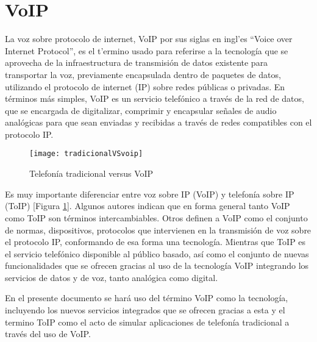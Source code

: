 	
	\section{VoIP}
	
	La voz sobre protocolo de internet, VoIP por sus siglas en 
	ingl'es “Voice over Internet Protocol”, es el t'ermino usado 
	para referirse a la tecnología que se aprovecha de la 
	infraestructura de transmisión de datos existente para 
	transportar la voz, previamente encapsulada dentro de paquetes 
	de datos, utilizando el protocolo de internet (IP) sobre 
	redes públicas o privadas. En términos más simples, VoIP 
	es un servicio telefónico a través de la red de datos, 
	que se encargada de digitalizar, comprimir y encapsular 
	señales de audio analógicas para que sean enviadas y recibidas 
	a través de redes compatibles con el protocolo IP.
	
	\begin{figure}[h]
		
		\texttt{[image: tradicionalVSvoip]}
		
		\caption{Telefonía tradicional versus VoIP}
		
		\centering
		
		\label{fig:ttvsv}
	\end{figure}

	Es muy importante diferenciar entre voz sobre IP (VoIP) y telefonía sobre IP 
	(ToIP) [Figura \ref{fig:ttvsv}]. Algunos autores \cite{switching} indican que 
	en forma general tanto VoIP como ToIP son términos intercambiables. Otros 
	\cite{voiptoip} definen a VoIP como el conjunto de normas, dispositivos, 
	protocolos que intervienen en la transmisión de voz sobre el protocolo IP, 
	conformando de esa forma una tecnología. Mientras que ToIP es el servicio 
	telefónico disponible al público basado, así como el conjunto de nuevas 
	funcionalidades que se ofrecen gracias al uso de la tecnología VoIP integrando 
	los servicios de datos y de voz, tanto analógica como digital. 
	
	En el presente documento se hará uso del término VoIP como la tecnología, 
	incluyendo los nuevos servicios integrados que se ofrecen gracias a esta 
	y el termino ToIP como el acto de simular aplicaciones de telefonía 
	tradicional a través del uso de VoIP.
	

